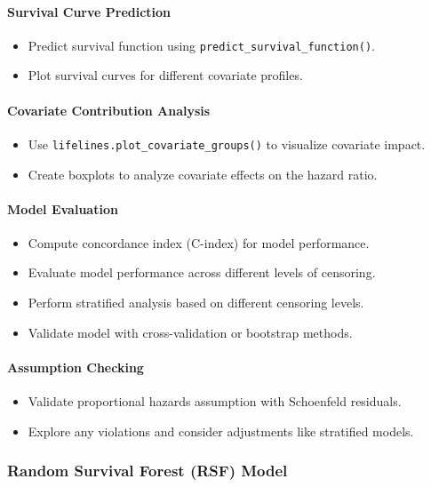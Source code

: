 \paragraph*{Survival Curve Prediction}
\begin{itemize}
    \item Predict survival function using \texttt{predict\_survival\_function()}.
    \item Plot survival curves for different covariate profiles.
\end{itemize}


\paragraph*{Covariate Contribution Analysis}
\begin{itemize}
    \item Use \texttt{lifelines.plot\_covariate\_groups()} to visualize covariate impact.
    \item Create boxplots to analyze covariate effects on the hazard ratio.
\end{itemize}

\paragraph*{Model Evaluation}
\begin{itemize}
    \item Compute concordance index (C-index) for model performance.
    \item Evaluate model performance across different levels of censoring.
    \item Perform stratified analysis based on different censoring levels.
    \item Validate model with cross-validation or bootstrap methods.
\end{itemize}

\paragraph*{Assumption Checking}
\begin{itemize}
    \item Validate proportional hazards assumption with Schoenfeld residuals.
    \item Explore any violations and consider adjustments like stratified models.
\end{itemize}

\subsubsection*{Random Survival Forest (RSF) Model}
